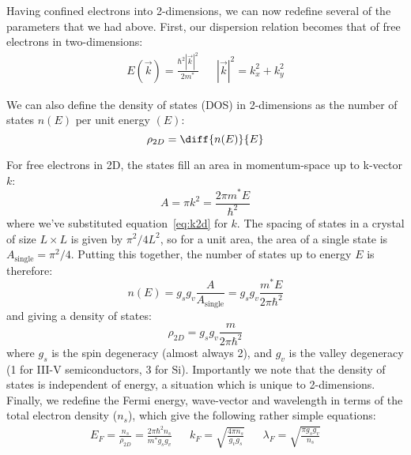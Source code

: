 Having confined electrons into 2-dimensions, we can now redefine several of the parameters that we had above. First, our
dispersion relation becomes that of free electrons in two-dimensions:
\begin{align}
  E(\vec{k}) = \frac{\hbar^2 |\vec{k}|^2}{2m^*} && |\vec{k}|^2 = k_x^2 + k_y^2
  \label{eq:k2d}
\end{align}

We can also define the density of states (DOS) in 2-dimensions as the number of states $n(E)$ per unit energy $(E)$:
\begin{equation}
  \rho_{2D} = \diff{n(E)}{E}
\end{equation}

For free electrons in 2D, the states fill an area in momentum-space up to k-vector $k$:
\begin{equation}
  A = \pi k^2 = \frac{2 \pi m^* E}{\hbar^2}
\end{equation}
where we've substituted equation~\ref{eq:k2d} for $k$. The spacing of states in a crystal of size $L \times L$ is given
by $\pi^2/4 L^2$, so for a unit area, the area of a single state is $A_{\textrm{single}} = \pi^2/4$. Putting this together,
the number of states up to energy $E$ is therefore:
\begin{equation}
  n(E) = g_s g_v \frac{A}{A_{\textrm{single}}} = g_s g_v \frac{m^* E}{2 \pi \hbar^2}
\end{equation}
and giving a density of states:
\begin{equation}
  \rho_{2D} = g_s g_v \frac{m}{2 \pi \hbar^2}
\end{equation}
where $g_s$ is the spin degeneracy (almost always 2), and $g_v$ is the valley degeneracy (1 for III-V semiconductors, 3 for Si).
Importantly we note that the density of states is independent of energy, a situation which is unique to 2-dimensions.
Finally, we redefine the Fermi energy, wave-vector and wavelength in terms of the total electron density ($n_s$), which give the following rather simple equations:
\begin{align}
  E_F = \frac{n_s}{\rho_{2D}} = \frac{2 \pi \hbar^2 n_s}{m^* g_s g_v} &&
  k_F = \sqrt{\frac{4 \pi n_s}{g_v g_s}} &&
  \lambda_F = \sqrt{\frac{\pi g_s g_v}{n_s}}
\end{align}

